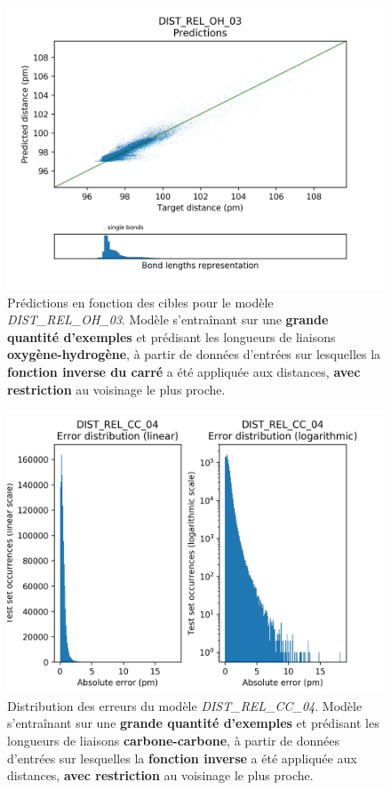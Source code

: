 \begin{figure}[!h]
	\centering
	
	\includegraphics[scale=0.75]{../figures/DIST_REL_OH_03/DIST_REL_OH_03_preds_targets.png}	
	
	\caption{Prédictions en fonction des cibles pour le modèle \emph{DIST\_REL\_OH\_03}. Modèle s'entraînant sur une \textbf{grande quantité d'exemples} et prédisant les longueurs de liaisons \textbf{oxygène-hydrogène}, à partir de données d'entrées sur lesquelles la \textbf{fonction inverse du carré} a été appliquée aux distances, \textbf{avec restriction} au voisinage le plus proche.}
	
\end{figure}



\begin{figure}[!h]
	\centering
	
	\includegraphics[scale=0.75]{../figures/DIST_REL_CC_04/DIST_REL_CC_04_distrib_rmse_val.png}	
	
	\caption{Distribution des erreurs du modèle \emph{DIST\_REL\_CC\_04}. Modèle s'entraînant sur une \textbf{grande quantité d'exemples} et prédisant les longueurs de liaisons \textbf{carbone-carbone}, à partir de données d'entrées sur lesquelles la \textbf{fonction inverse} a été appliquée aux distances, \textbf{avec restriction} au voisinage le plus proche.}
\end{figure}


